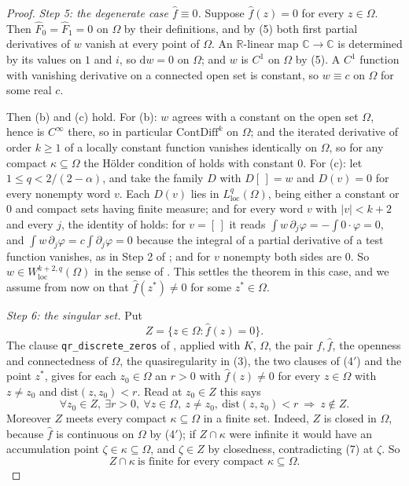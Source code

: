 \begin{proof}
\emph{Step 5: the degenerate case $\hat f\equiv0$.}  Suppose $\hat f(z)=0$ for
every $z\in\Omega$.  Then $\hat F_0=\hat F_1=0$ on $\Omega$ by their
definitions, and by (5) both first partial derivatives of $w$ vanish at every
point of $\Omega$.  An
$\mathbb{R}$-linear map $\mathbb{C}\to\mathbb{C}$ is determined by its values
on $1$ and $i$, so $\mathrm{d}w=0$ on $\Omega$; and $w$ is $C^1$ on $\Omega$ by
(5).  A $C^{1}$ function with vanishing derivative on a connected open set is
constant, so $w\equiv c$ on $\Omega$ for some real $c$.

Then (b) and (c) hold.  For (b): $w$ agrees with a constant on the open set
$\Omega$, hence is $C^\infty$ there, so in particular
$\mathrm{ContDiff}^{k}$ on $\Omega$; and the iterated derivative of order
$k\ge1$ of a locally constant function vanishes identically on $\Omega$, so for
any compact $\kappa\subseteq\Omega$ the H\"older condition of
 holds with constant $0$.  For (c): let
$1\le q<2/(2-\alpha)$, and take the family $D$ with $D[\,]=w$ and $D(v)=0$ for
every nonempty word $v$.  Each $D(v)$ lies in $L^{q}_{\mathrm{loc}}(\Omega)$,
being either a constant or $0$ and compact sets having finite measure; and for
every word $v$ with $|v|<k+2$ and every $j$, the identity of
 holds: for $v=[\,]$ it reads
$\int w\,\partial_j\varphi=-\int0\cdot\varphi=0$, and
$\int w\,\partial_j\varphi=c\int\partial_j\varphi=0$ because the integral of a
partial derivative of a test function vanishes, as in Step 2 of
; and for $v$ nonempty both sides are $0$.  So
$w\in W^{k+2,q}_{\mathrm{loc}}(\Omega)$ in the sense of .
This settles the theorem in this case, and we assume from now on that
$\hat f(z^{*})\neq0$ for some $z^{*}\in\Omega$.

\emph{Step 6: the singular set.}  Put
\[
  Z=\{z\in\Omega:\hat f(z)=0\} .
\]
The clause \texttt{qr\_discrete\_zeros} of , applied with
$K$, $\Omega$, the pair $f,\hat f$, the openness and connectedness of
$\Omega$, the quasiregularity in (3), the two clauses of (4$'$) and the point
$z^{*}$, gives for each $z_0\in\Omega$ an $r>0$ with $\hat f(z)\neq0$ for every
$z\in\Omega$ with $z\neq z_0$ and $\mathrm{dist}(z,z_0)<r$.  Read at $z_0\in Z$
this says
\begin{equation}\tag{7}
  \forall z_0\in Z,\ \exists r>0,\ \forall z\in\Omega,\ z\neq z_0,\
  \mathrm{dist}(z,z_0)<r\ \Rightarrow\ z\notin Z .
\end{equation}
Moreover $Z$ meets every compact $\kappa\subseteq\Omega$ in a finite set.
Indeed, $Z$ is closed in $\Omega$, because $\hat f$ is continuous on $\Omega$
by (4$'$); if $Z\cap\kappa$ were infinite it would have an accumulation point
$\zeta\in\kappa\subseteq\Omega$, and $\zeta\in Z$ by closedness, contradicting
(7) at $\zeta$.  So
\begin{equation}\tag{8}
  Z\cap\kappa\ \text{is finite for every compact }\kappa\subseteq\Omega .
\end{equation}


\end{proof}
